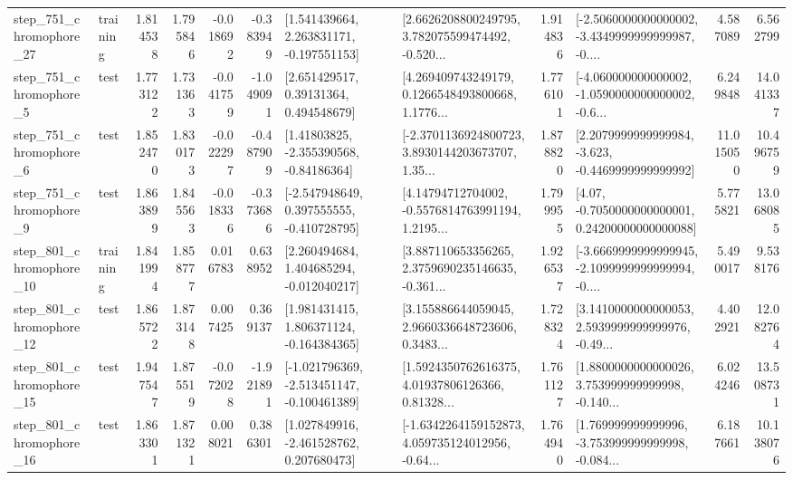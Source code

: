 \begin{tabular}{llrrrrllrlrr}
  step\_751\_chromophore\_27 &  training &      1.814538 &    1.795846 &     -0.018692 & -0.383949 &    [1.541439664, 2.263831171, -0.197551153] &  [2.6626208800249795, 3.782075599474492, -0.520... &       1.914836 &  [-2.5060000000000002, -3.4349999999999987, -0.... &            4.587089 &          6.562799 \\
   step\_751\_chromophore\_5 &      test &      1.773122 &    1.731363 &     -0.041759 & -1.049091 &      [2.651429517, 0.39131364, 0.494548679] &  [4.269409743249179, 0.1266548493800668, 1.1776... &       1.776101 &  [-4.060000000000002, -1.0590000000000002, -0.6... &            6.249848 &         14.041337 \\
   step\_751\_chromophore\_6 &      test &      1.852470 &    1.830173 &     -0.022297 & -0.487909 &     [1.41803825, -2.355390568, -0.84186364] &  [-2.3701136924800723, 3.8930144203673707, 1.35... &       1.878820 &  [2.2079999999999984, -3.623, -0.4469999999999992] &           11.015050 &         10.496759 \\
   step\_751\_chromophore\_9 &      test &      1.863899 &    1.845563 &     -0.018336 & -0.373686 &   [-2.547948649, 0.397555555, -0.410728795] &  [4.14794712704002, -0.5576814763991194, 1.2195... &       1.799955 &   [4.07, -0.7050000000000001, 0.24200000000000088] &            5.775821 &         13.068085 \\
  step\_801\_chromophore\_10 &  training &      1.841994 &    1.858777 &      0.016783 &  0.638952 &    [2.260494684, 1.404685294, -0.012040217] &  [3.887110653356265, 2.3759690235146635, -0.361... &       1.926537 &  [-3.6669999999999945, -2.1099999999999994, -0.... &            5.490017 &          9.538176 \\
  step\_801\_chromophore\_12 &      test &      1.865722 &    1.873148 &      0.007425 &  0.369137 &    [1.981431415, 1.806371124, -0.164384365] &  [3.155886644059045, 2.9660336648723606, 0.3483... &       1.728324 &  [3.1410000000000053, 2.5939999999999976, -0.49... &            4.402921 &         12.082764 \\
  step\_801\_chromophore\_15 &      test &      1.947547 &    1.875519 &     -0.072028 & -1.921891 &  [-1.021796369, -2.513451147, -0.100461389] &  [1.5924350762616375, 4.01937806126366, 0.81328... &       1.761127 &  [1.8800000000000026, 3.753999999999998, -0.140... &            6.024246 &         13.508731 \\
  step\_801\_chromophore\_16 &      test &      1.863301 &    1.871321 &      0.008021 &  0.386301 &    [1.027849916, -2.461528762, 0.207680473] &  [-1.6342264159152873, 4.059735124012956, -0.64... &       1.764940 &  [1.769999999999996, -3.753999999999998, -0.084... &            6.187661 &         10.138076 \\

\end{tabular}
